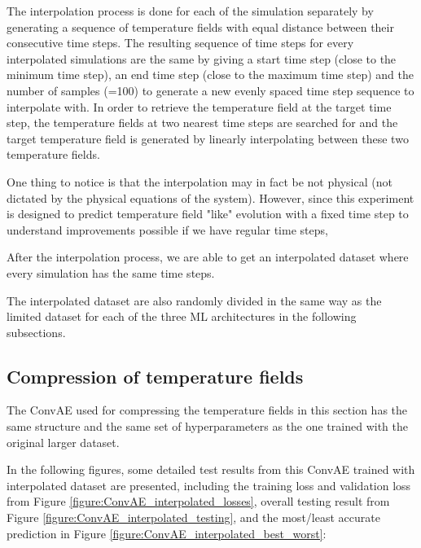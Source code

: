 The interpolation process is done for each of the simulation separately by generating a sequence of temperature fields with equal distance between their consecutive time steps. The resulting sequence of time steps for every interpolated simulations are the same by giving a start time step (close to the minimum time step), an end time step (close to the maximum time step) and the number of samples (=100) to generate a new evenly spaced time step sequence to interpolate with. In order to retrieve the temperature field at the target time step, the temperature fields at two nearest time steps are searched for and the target temperature field is generated by linearly interpolating between these two temperature fields.

One thing to notice is that the interpolation may in fact be not physical (not dictated by the physical equations of the system). However, since this experiment is designed to predict temperature field "like" evolution with a fixed time step to understand improvements possible if we have regular time steps, 

After the interpolation process, we are able to get an interpolated dataset where every simulation has the same time steps.

The interpolated dataset are also randomly divided in the same way as the limited dataset for each of the three ML architectures in the following subsections.


\subsection{Compression of temperature fields}

The ConvAE used for compressing the temperature fields in this section has the same structure and the same set of hyperparameters as the one trained with the original larger dataset.

In the following figures, some detailed test results from this ConvAE trained with interpolated dataset are presented, including the training loss and validation loss from Figure \ref{figure:ConvAE_interpolated_losses}, overall testing result from Figure \ref{figure:ConvAE_interpolated_testing}, and the most/least accurate prediction in Figure \ref{figure:ConvAE_interpolated_best_worst}:


